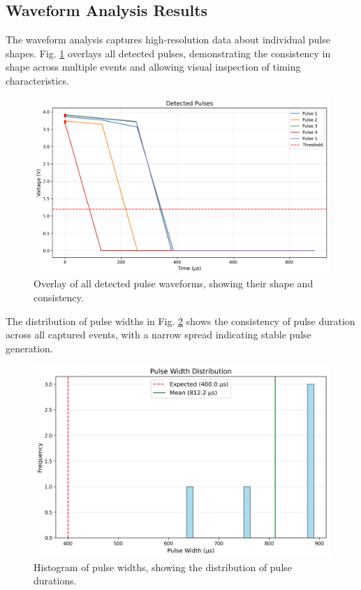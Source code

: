 \documentclass[conference]{IEEEtran}
\begin{document}
\subsection{Waveform Analysis Results}
The waveform analysis captures high-resolution data about individual pulse shapes. Fig. \ref{fig:waveform_all_pulses} overlays all detected pulses, demonstrating the consistency in shape across multiple events and allowing visual inspection of timing characteristics.

\begin{figure}[htbp]
    \centering
    \includegraphics[width=\linewidth]{data/waveform_session_2025-05-09_1445/plots/waveform_all_pulses.png}
    \caption{Overlay of all detected pulse waveforms, showing their shape and consistency.}
    \label{fig:waveform_all_pulses}
\end{figure}

The distribution of pulse widths in Fig. \ref{fig:waveform_width_hist} shows the consistency of pulse duration across all captured events, with a narrow spread indicating stable pulse generation.

\begin{figure}[htbp]
    \centering
    \includegraphics[width=\linewidth]{data/waveform_session_2025-05-09_1445/plots/waveform_width_hist.png}
    \caption{Histogram of pulse widths, showing the distribution of pulse durations.}
    \label{fig:waveform_width_hist}
\end{figure}
\end{document}
